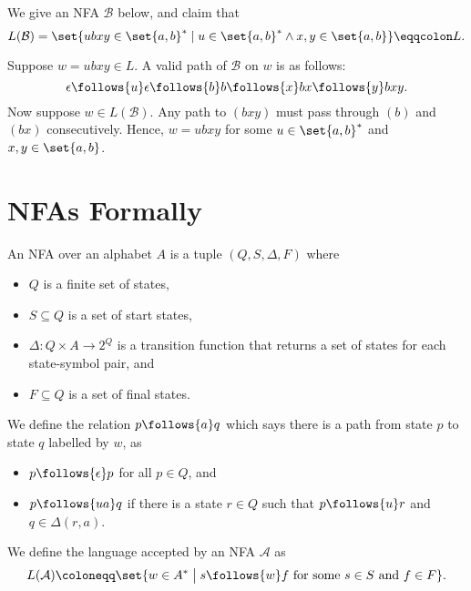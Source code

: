 \begin{solution} \leavevmode
    We give an NFA $\mathcal{B}$ below, and claim that \[
        L(\mathcal{B}) = \set{ubxy \in \set{a, b}^*
            \mid u \in \set{a, b}^* \land x, y \in \set{a, b}} \eqqcolon L.
    \]
    \begin{center}
    \end{center}
    Suppose $w = ubxy \in L$.
    A valid path of $\mathcal{B}$ on $w$ is as follows: \[
        \epsilon \follows{u} \epsilon \follows{b} b
        \follows{x} bx \follows{y} bxy.
    \]
    Now suppose $w \in L(\mathcal{B})$.
    Any path to $(bxy)$ must pass through $(b)$ and $(bx)$ consecutively.
    Hence, $w = ubxy$ for some $u \in \set{a, b}^*$ and
    $x, y \in \set{a, b}$.
\end{solution}

\section{NFAs Formally} \label{sec:nfa:formal}
\begin{definition}
    An NFA over an alphabet $A$ is a tuple $(Q, S, \Delta, F)$ where
    \begin{itemize}
        \item $Q$ is a finite set of states,
        \item $S \subseteq Q$ is a set of start states,
        \item $\Delta\colon Q \times A \to 2^Q$ is a transition function
        that returns a set of states for each state-symbol pair, and
        \item $F \subseteq Q$ is a set of final states.
    \end{itemize}
    We define the relation $p \follows{a} q$ which says there is a path
    from state  $p$ to state $q$ labelled by $w$, as
    \begin{itemize}
        \item $p \follows{\epsilon} p$ for all $p \in Q$, and
        \item $p \follows{ua} q$ if there is a state $r \in Q$ such that
        $p \follows{u} r$ and $q \in \Delta(r, a)$.
    \end{itemize}
    We define the language accepted by an NFA $\mathcal{A}$ as \[
        L(\mathcal{A}) \coloneqq \set{w \in A^* \;\big\vert\; s
        \follows{w} f \text{ for some } s \in S \text{ and } f \in F}.
    \]
\end{definition}

